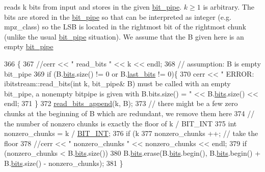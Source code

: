 reads k bits from input and stores in the given \hyperlink{classbit__pipe}{bit\+\_\+pipe}. $k \geq 1$ is arbitrary. The bits are stored in the \hyperlink{classbit__pipe}{bit\+\_\+pipe} so that can be interpreted as integer (e.\+g. mpz\+\_\+class) so the L\+SB is located in the rightmost bit of the rightmost chunk (unlike the usual \hyperlink{classbit__pipe}{bit\+\_\+pipe} situation). We assume that the B given here is an empty \hyperlink{classbit__pipe}{bit\+\_\+pipe} 


\begin{DoxyCode}
366                                             \{
367   \textcolor{comment}{//cerr << " read\_bits " << k << endl;}
368   \textcolor{comment}{// assumption: B is empty bit\_pipe}
369   \textcolor{keywordflow}{if} (B.\hyperlink{classbit__pipe_a86f38af1e9736b053728033490476b50}{bits}.size() != 0 or B.\hyperlink{classbit__pipe_a0f3e84b02751803adaab499b5dad86fe}{last\_bits} != 0)\{
370     cerr << \textcolor{stringliteral}{" ERROR: ibitstream::read\_bits(int k, bit\_pipe& B) must be called with an empty bit\_pipe, a
       nonempty bitpipe is given with B.bits.size() = "} << B.\hyperlink{classbit__pipe_a86f38af1e9736b053728033490476b50}{bits}.size() << endl;
371   \}
372   \hyperlink{classibitstream_acec2e9efa21551ce8db784f5b0bbd1b5}{read\_bits\_append}(k, B);
373   \textcolor{comment}{// there might be a few zero chunks at the beginning of B which are redundant, we remove them here}
374   \textcolor{comment}{// the number of nonzero chunks is exactly the floor of k / BIT\_INT}
375   \textcolor{keywordtype}{int} nonzero\_chunks = k / \hyperlink{bitstream_8h_afcadf5aa65c5159bfb96c4d82ebc0a5d}{BIT\_INT};
376   \textcolor{keywordflow}{if} (k %
377     nonzero\_chunks ++; \textcolor{comment}{// take the floor}
378   \textcolor{comment}{//cerr << " nonzero\_chunks " << nonzero\_chunks << endl;}
379   \textcolor{keywordflow}{if} (nonzero\_chunks < B.\hyperlink{classbit__pipe_a86f38af1e9736b053728033490476b50}{bits}.size())
380     B.\hyperlink{classbit__pipe_a86f38af1e9736b053728033490476b50}{bits}.erase(B.\hyperlink{classbit__pipe_a86f38af1e9736b053728033490476b50}{bits}.begin(), B.\hyperlink{classbit__pipe_a86f38af1e9736b053728033490476b50}{bits}.begin() + B.\hyperlink{classbit__pipe_a86f38af1e9736b053728033490476b50}{bits}.size() - nonzero\_chunks);
381 \}
\end{DoxyCode}
\mbox{\label{classibitstream_acec2e9efa21551ce8db784f5b0bbd1b5}} 
